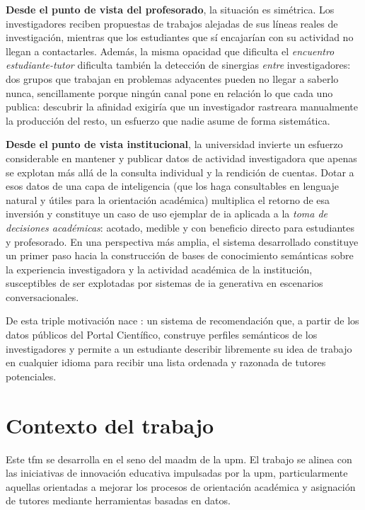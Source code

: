 \textbf{Desde el punto de vista del profesorado}, la situación es simétrica.
Los investigadores reciben propuestas de trabajos alejadas de sus líneas reales de investigación, mientras que los estudiantes que sí encajarían con su actividad no llegan a contactarles.
Además, la misma opacidad que dificulta el \emph{encuentro estudiante-tutor} dificulta también la detección de sinergias \emph{entre} investigadores: dos grupos que trabajan en problemas adyacentes pueden no llegar a saberlo nunca, sencillamente porque ningún canal pone en relación lo que cada uno publica: descubrir la afinidad exigiría que un investigador rastreara manualmente la producción del resto, un esfuerzo que nadie asume de forma sistemática.

\textbf{Desde el punto de vista institucional}, la universidad invierte un esfuerzo considerable en mantener y publicar datos de actividad investigadora que apenas se explotan más allá de la consulta individual y la rendición de cuentas.
Dotar a esos datos de una capa de inteligencia (que los haga consultables en lenguaje natural y útiles para la orientación académica) multiplica el retorno de esa inversión y constituye un caso de uso ejemplar de \gls{ia} aplicada a la \emph{toma de decisiones académicas}: acotado, medible y con beneficio directo para estudiantes y profesorado.
En una perspectiva más amplia, el sistema desarrollado constituye un primer paso hacia la construcción de bases de conocimiento semánticas sobre la experiencia investigadora y la actividad académica de la institución, susceptibles de ser explotadas por sistemas de \gls{ia} generativa en escenarios conversacionales.

De esta triple motivación nace \proyecto: un sistema de recomendación que, a partir de los datos públicos del Portal Científico, construye perfiles semánticos de los investigadores y permite a un estudiante describir libremente su idea de trabajo en cualquier idioma para recibir una lista ordenada y razonada de tutores potenciales.

\section{Contexto del trabajo}
\label{sec:contexto}

Este \gls{tfm} se desarrolla en el seno del \gls{maadm} de la \gls{upm}.
El trabajo se alinea con las iniciativas de innovación educativa impulsadas por la \gls{upm}, particularmente aquellas orientadas a mejorar los procesos de orientación académica y asignación de tutores mediante herramientas basadas en datos.

